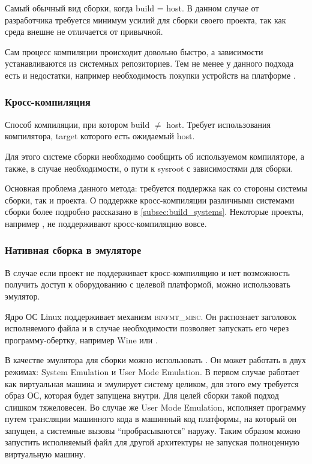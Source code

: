 Самый обычный вид сборки, когда build = host.
В данном случае от разработчика требуется минимум усилий для сборки своего проекта, так как среда внешне не отличается от привычной.

Сам процесс компиляции происходит довольно быстро, а зависимости устанавливаются из системных репозиториев.
Тем не менее у данного подхода есть и недостатки, например необходимость покупки устройств на платформе \riscv{}.

\subsubsection{Кросс-компиляция}

Способ компиляции, при котором build $\neq$ host.
Требует использования компилятора, target которого есть ожидаемый host.

Для этого системе сборки необходимо сообщить об используемом компиляторе, а также, в случае необходимости, о пути к sysroot с зависимостями для сборки.

Основная проблема данного метода: требуется поддержка как со стороны системы сборки, так и проекта.
О поддержке кросс-компиляции различными системами сборки более подробно рассказано в \ref{subsec:build_systems}.
Некоторые проекты, например \OCaml{}, не поддерживают кросс-компиляцию вовсе.

\subsubsection{Нативная сборка в эмуляторе}

В случае если проект не поддерживает кросс-компиляцию и нет возможность получить доступ к оборудованию с целевой платформой, можно использовать эмулятор.

Ядро ОС Linux поддерживает механизм \textsc{binfmt\_misc}.
Он распознает заголовок исполняемого файла и в случае необходимости позволяет запускать его через программу-обертку, например Wine или \qemu{}.

В качестве эмулятора для сборки можно использовать \qemu{}.
Он может работать в двух режимах: System Emulation и User Mode Emulation.
В первом случае \qemu{} работает как виртуальная машина и эмулирует систему целиком, для этого ему требуется образ ОС, которая будет запущена внутри.
Для целей сборки такой подход слишком тяжеловесен.
Во случае же User Mode Emulation, \qemu{} исполняет программу путем трансляции машинного кода в машинный код платформы, на который он запущен, а системные вызовы \enquote{пробрасываются} наружу.
Таким образом можно запустить исполняемый файл для другой архитектуры не запуская полноценную виртуальную машину.


